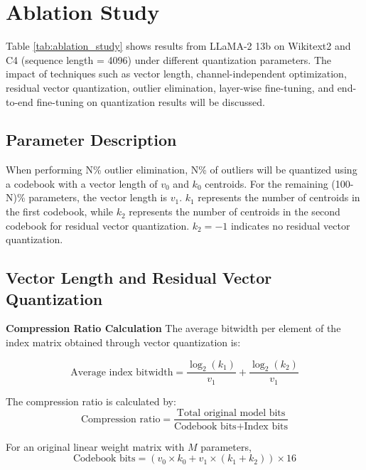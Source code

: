 \section{Ablation Study}
\label{sec:ablation_study}


Table \ref{tab:ablation_study} shows results from LLaMA-2 13b on Wikitext2 and C4 (sequence length = 4096) under different quantization parameters. The impact of techniques such as vector length, channel-independent optimization, residual vector quantization, outlier elimination, layer-wise fine-tuning, and end-to-end fine-tuning on quantization results will be discussed.
\subsection{Parameter Description}
When performing N\% outlier elimination, N\% of outliers will be quantized using a codebook with a vector length of $v_0$ and $k_0$ centroids. For the remaining (100-N)\% parameters, the vector length is $v_1$. $k_1$ represents the number of centroids in the first codebook, while $k_2$ represents the number of centroids in the second codebook for residual vector quantization. $k_2=-1$ indicates no residual vector quantization.
\subsection{Vector Length and Residual Vector Quantization}
\textbf{Compression Ratio Calculation} 
The average bitwidth per element of the index matrix obtained through vector quantization is:

\begin{equation}
    \text{Average index bitwidth}=\frac{\log_2(k_1)}{v_1} + \frac{\log_2(k_2)}{v_1}
    \nonumber
\end{equation}


The compression ratio is calculated by:
\begin{equation}
    \text{Compression ratio} = \frac{\text{Total original model bits}}{\text{Codebook bits} + \text{Index bits}}
    \nonumber
\end{equation}



For an original linear weight matrix with $M$ parameters,
\begin{equation}
\text{Codebook bits} = (v_0 \times k_0
    + v_1 \times (k_1 + k_2))  \times 16
    \nonumber
\end{equation}


